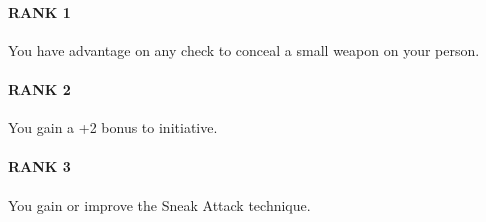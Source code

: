 \paragraph{RANK 1} You have advantage on any check to conceal a small weapon on your person.
\paragraph{RANK 2} You gain a +2 bonus to initiative. %
\paragraph{RANK 3} You gain or improve the Sneak Attack technique.

